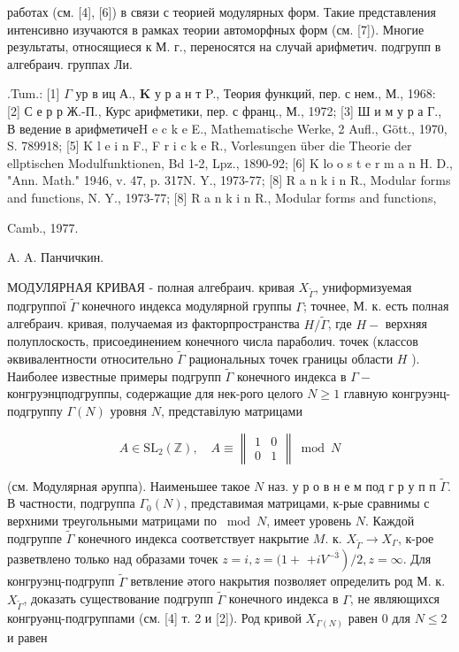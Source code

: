 \documentclass[10pt]{article}
\begin{document}
работах (см. [4], [6]) в связи с теорией модулярных форм. Такие представления интенсивно изучаются в рамках теории автоморфных форм (см. [7]). Многие результаты, относящиеся к М. г., переносятся на случай арифметич. подгрупп в алгебраич. группах Ли.



.Tum.: [1] $\Gamma$ ур в иц А., $\mathbf{K}$ у р а н т P., Теория функций, пер. с нем., М., 1968: [2] С е р р Ж.-П., Курс арифметики, пер. с франц., М., 1972; [3] Ш и м у р а Г., В ведение в арифметичеH e c k e E., Mathematische Werke, 2 Aufl., Gött., 1970, S. 789918; [5] K l e i n F., F r i c k e R., Vorlesungen über die Theorie der ellptischen Modulfunktionen, Bd 1-2, Lpz., 1890-92; [6] K lo o s t e r m a n H. D., "Ann. Math." 1946, v. 47, p. 317N. Y., 1973-77; [8] R a n k i n R., Modular forms and functions, N. Y., 1973-77; [8] R a n k i n R., Modular forms and functions,

Camb., 1977.

A. A. Панчичкин.



МОДУЛЯРНАЯ КРИВАЯ - полная алгебраич. кривая $X_{\tilde{\Gamma}}$, униформизуемая подгруппої $\tilde{\Gamma}$ конечного индекса модулярной группы $\Gamma$; точнее, М. к. есть полная алгебраич. кривая, получаемая из факторпространства $H / \tilde{\Gamma}$, где $H-$ верхняя полуплоскость, присоединением конечного числа параболич. точек (классов әквивалентности относительно $\widetilde{\Gamma}$ рациональных точек границы области $H$ ). Наиболее известные примеры подгрупп $\tilde{\Gamma}$ конечного индекса в $\Gamma-$ конгруэнцподгруппы, содержащие для нек-рого целого $N \geqslant 1$ главную конгруэнц-подгруппу $\Gamma(N)$ уровня $N$, представілую матрицами



\[

A \in \mathrm{SL}_{2}(\mathbb{Z}), \quad A \equiv\left\|\begin{array}{ll}

1 & 0 \\

0 & 1

\end{array}\right\| \bmod N

\]



(см. Модулярная әруппа). Наименьшее такое $N$ наз. у р о в н е м под г р у п п $\tilde{\Gamma}$. В частности, подгруппа $\Gamma_{0}(N)$, представимая матрицами, к-рые сравнимы с верхними треугольными матрицами по $\bmod N$, имеет уровень $N$. Каждой подгруппе $\tilde{\Gamma}$ конечного индекса соответствует накрытие $M$. к. $X_{\tilde{\Gamma}} \rightarrow X_{\Gamma}$, к-рое разветвлено только над образами точек $z=i, z=(1+$ $\left.+i V^{-\overline{3}}\right) / 2, z=\infty$. Для конгруэнц-подгрупп $\tilde{\Gamma}$ ветвление әтого накрытия позволяет определить род М. к. $X_{\tilde{\Gamma}}$, доказать существование подгрупп $\tilde{\Gamma}$ конечного индекса в $\Gamma$, не являющихся конгруәнц-подгруппами (см. [4] т. 2 и [2]). Род кривой $X_{\Gamma(N)}$ равен 0 для $N \leqslant 2$ и равен
\end{document}
